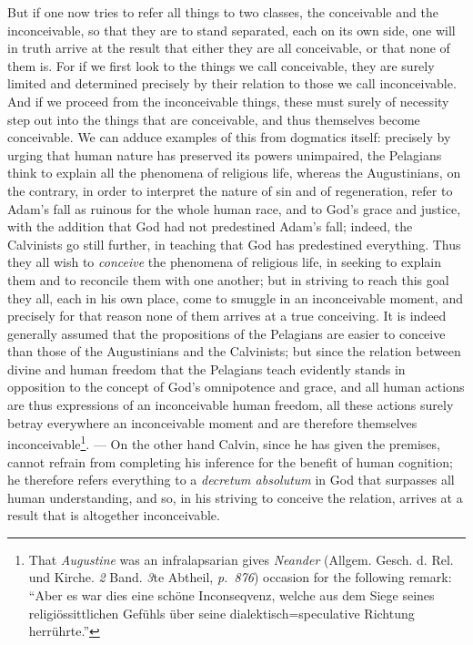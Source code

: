 \documentclass[12pt]{book}
\newcommand{\opage}[1]{\marginnote{\footnotesize\textit{[#1]}}}
\begin{document}
But if one now tries to refer all things to two classes, the conceivable and
the inconceivable, so that they are to stand separated, each on its own side,
one will in truth arrive at the result that either they are all conceivable, or
that
\opage{49} \setcounter{footnote}{0}%
none of them is. For if we first look to the things we call conceivable, they
are surely limited and determined precisely by their relation to those we call
inconceivable. And if we proceed from the inconceivable things, these must
surely of necessity step out into the things that are conceivable, and thus
themselves become conceivable. We can adduce examples of this from dogmatics
itself: precisely by urging that human nature has preserved its powers
unimpaired, the Pelagians think to explain all the phenomena of religious life,
whereas the Augustinians, on the contrary, in order to interpret the nature of
sin and of regeneration, refer to Adam's fall as ruinous for the whole human
race, and to God's grace and justice, with the addition that God had not
predestined Adam's fall; indeed, the Calvinists go still further, in teaching
that God has predestined everything. Thus they all wish to \emph{conceive} the
phenomena of religious life, in seeking to explain them and to reconcile them
with one another; but in striving to reach this goal they all, each in his own
place, come to smuggle in an inconceivable moment, and precisely for that
reason none of them arrives at a true conceiving. It is indeed generally assumed
that the propositions of the Pelagians are easier to conceive than those of the
Augustinians and the Calvinists; but since the relation between divine and
human freedom that the Pelagians teach evidently stands in opposition to the
concept of God's omnipotence and grace, and all human actions are thus
expressions of an inconceivable human freedom, all these actions surely betray
everywhere an inconceivable moment and are therefore themselves
inconceivable\footnote{That \emph{Augustine} was an infralapsarian gives
\emph{Neander} (Allgem. Gesch. d. Rel. und Kirche. \textit{2} Band. \textit{3}te
Abtheil, \textit{p.\ 876}) occasion for the following remark: ``Aber es war dies
eine schöne Inconseqvenz, welche aus dem Siege seines religiössittlichen Gefühls
über seine dialektisch=speculative Richtung herrührte.''}. --- On the other
hand Calvin, since he
\opage{50} \setcounter{footnote}{0}%
has given the premises, cannot refrain from completing his inference for the
benefit of human cognition; he therefore refers everything to a \textit{decretum
absolutum} in God that surpasses all human understanding, and so, in his
striving to conceive the relation, arrives at a result that is altogether
inconceivable.
\end{document}
